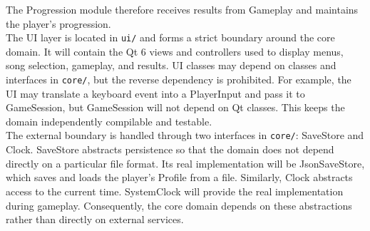 \documentclass[12pt,a4paper]{article}
\newcommand\tab[1][1cm]{\hspace*{#1}}
\begin{document}
    The Progression module therefore receives results from Gameplay and maintains the player's progression. \\
    \tab The UI layer is located in \texttt{ui/} and forms a strict boundary around the core domain.
    It will contain the Qt 6 views and controllers used to display menus, song selection, gameplay, and results.
    UI classes may depend on classes and interfaces in \texttt{core/}, but the reverse dependency is prohibited.
    For example, the UI may translate a keyboard event into a PlayerInput and pass it to GameSession, but GameSession will not depend on Qt classes.
    This keeps the domain independently compilable and testable. \\
    \tab The external boundary is handled through two interfaces in \texttt{core/}: SaveStore and Clock.
    SaveStore abstracts persistence so that the domain does not depend directly on a particular file format.
    Its real implementation will be JsonSaveStore, which saves and loads the player's Profile from a file.
    Similarly, Clock abstracts access to the current time. SystemClock will provide the real implementation during gameplay.
    Consequently, the core domain depends on these abstractions rather than directly on external services.

\pagebreak
\end{document}
